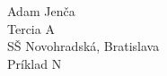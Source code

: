 \documentclass{article}
\begin{document}
\noindent
Adam Jenča\\
Tercia A\\
SŠ Novohradská, Bratislava\\
Príklad N\\
\vskip 10mm \noindent
\end{document}
